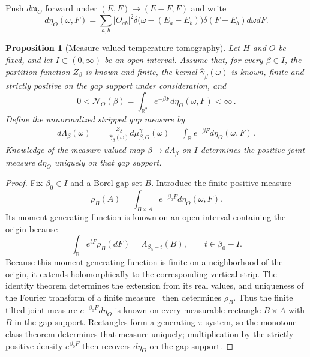 \documentclass[a4paper,11pt]{article}
\def\dd{d}%
\def\ee{e}%
\newtheorem{proposition}{Proposition}[section]
\theoremstyle{definition}
\theoremstyle{remark}
\newcommand{\dd}{\mathrm d}
\newcommand{\ee}{\mathrm e}
\newcommand{\RR}{\mathbb R}
\begin{document}
Push $\dd\mathfrak m_O$ forward under
$(E,F)\mapsto(E-F,F)$ and write
\begin{equation}
   \dd\eta_O(\omega,F)
   =\sum_{a,b}|O_{ab}|^2
     \delta\!\bigl(\omega-(E_a-E_b)\bigr)
     \delta(F-E_b)\dd\omega\dd F.
   \label{eq:gap-source-transition-measure-app}
\end{equation}
\begin{proposition}[Measure-valued temperature tomography]
\label{prop:temperature-tomography-app}
Let $H$ and $O$ be fixed, and let $I\subset(0,\infty)$ be an open interval.  Assume that, for
every $\beta\in I$, the partition function $Z_\beta$ is known and finite, the kernel
$\widehat\gamma_\beta(\omega)$ is known, finite and strictly positive on the gap support under
consideration, and
\begin{equation}
   0<\mathcal N_O(\beta)
   =\int_{\RR^2}\ee^{-\beta F}\dd\eta_O(\omega,F)<\infty\,.
   \label{eq:temperature-exponential-moment-app}
\end{equation}
Define the unnormalized stripped gap measure by
\begin{equation}
\begin{aligned}
   \dd\Lambda_\beta(\omega)
   &=\frac{Z_\beta}{\widehat\gamma_\beta(\omega)}
      \dd\mu^\gamma_{\beta,O}(\omega)
   =\int_\RR \ee^{-\beta F}\dd\eta_O(\omega,F)\,.
\end{aligned}
   \label{eq:temperature-measure-laplace-app}
\end{equation}
Knowledge of the measure-valued map $\beta\mapsto\dd\Lambda_\beta$ on $I$ determines the
positive joint measure $\dd\eta_O$ uniquely on that gap support.
\end{proposition}

\begin{proof}
Fix $\beta_0\in I$ and a Borel gap set $B$.  Introduce the finite positive measure
\begin{equation}
   \rho_B(A)=\int_{B\times A}\ee^{-\beta_0F}\dd\eta_O(\omega,F).
\end{equation}
Its moment-generating function is known on an open interval containing the origin because
\begin{equation}
   \int_\RR\ee^{tF}\rho_B(\dd F)=\Lambda_{\beta_0-t}(B),
   \qquad t\in\beta_0-I.
\end{equation}
Because this moment-generating function is finite on a neighborhood of the origin, it extends holomorphically to the corresponding vertical strip. The identity theorem determines the extension from its real values, and uniqueness of the Fourier transform of a finite measure~\cite{Folland1999} then determines $\rho_B$. Thus the finite tilted joint measure $\ee^{-\beta_0F}\dd\eta_O$ is known on every measurable rectangle $B\times A$ with $B$ in the gap support. Rectangles form a generating $\pi$-system, so the monotone-class theorem determines that measure uniquely; multiplication by the strictly positive density $\ee^{\beta_0F}$ then recovers $\dd\eta_O$ on the gap support.%
\end{proof}
\end{document}
